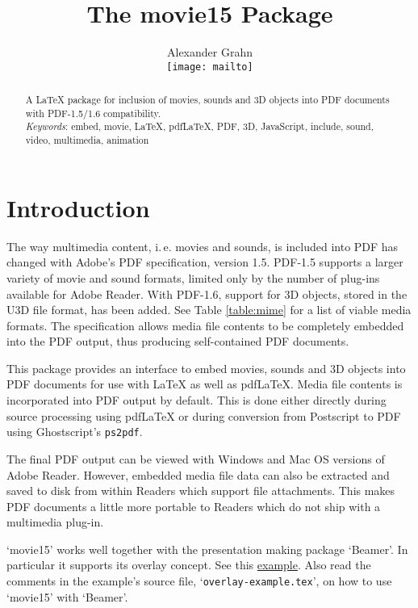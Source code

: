 \documentclass[a4paper]{article}
\begin{document}
\title{The {\sffamily movie15} Package}
\author{Alexander Grahn\\[1ex]\texttt{[image: mailto]}}
\maketitle

\begin{abstract}\noindent
A \LaTeX{} package for inclusion of movies, sounds and 3D objects into PDF documents with PDF-1.5/1.6 compatibility.\\[0.2\baselineskip]
\emph{Keywords}: embed, movie, LaTeX, pdfLaTeX, PDF, 3D, JavaScript, \mbox{include}, sound, video, multimedia, animation
\end{abstract}

\tableofcontents

\section{Introduction}

The way multimedia content, i.\,e. movies and sounds, is included into PDF has changed with Adobe's PDF specification, version 1.5. PDF-1.5 supports a larger variety of movie and sound formats, limited only by the number of plug-ins available for Adobe Reader\textsuperscript{\scriptsize\textregistered}. With PDF-1.6, support for 3D objects, stored in the U3D file format, has been added. See Table \ref{table:mime} for a list of viable media formats. The specification allows media file contents to be completely embedded into the PDF output, thus producing self-contained PDF documents.

This package provides an interface to embed movies, sounds and 3D objects into PDF documents for use with \LaTeX{} as well as pdf\LaTeX. Media file contents is incorporated into PDF output by default. This is done either directly during source processing using pdf\LaTeX{} or during conversion from Postscript to PDF using Ghostscript's \verb+ps2pdf+.

The final PDF output can be viewed with Windows\textsuperscript{\scriptsize\textregistered} and Mac OS\textsuperscript{\scriptsize\textregistered} versions of Adobe Reader. However, embedded media file data can also be extracted and saved to disk from within Readers which support file attachments. This makes PDF documents a little more portable to Readers which do not ship with a multimedia plug-in.

`movie15' works well together with the presentation making package `Beamer'. In particular it supports its overlay concept. See this \href{./overlay-example.pdf}{example}.
Also read the comments in the example's source file, `\verb+overlay-example.tex+', on how to use `movie15' with `Beamer'.
\end{document}
